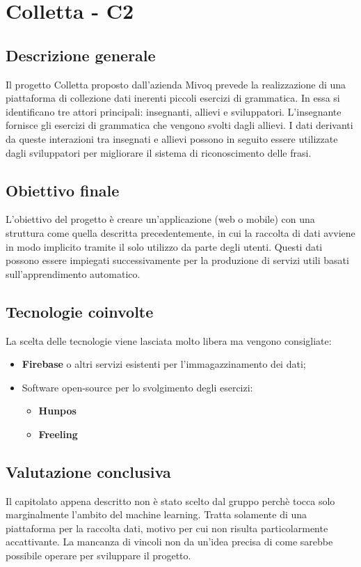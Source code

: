 \section{Colletta - C2} \label{c2}
    \subsection{Descrizione generale}
    Il progetto Colletta proposto dall'azienda Mivoq prevede la realizzazione di una piattaforma di collezione dati inerenti piccoli esercizi di grammatica. In essa si identificano tre attori principali: insegnanti, allievi e sviluppatori. L'insegnante fornisce gli esercizi di grammatica che vengono svolti dagli allievi. I dati derivanti da queste interazioni tra insegnati e allievi possono in seguito essere utilizzate dagli sviluppatori per migliorare il sistema di riconoscimento delle frasi.

    \subsection{Obiettivo finale}
    L'obiettivo del progetto è creare un'applicazione (web o mobile) con una struttura come quella descritta precedentemente, in cui la raccolta di dati avviene in modo implicito tramite il solo utilizzo da parte degli utenti. Questi dati possono essere impiegati successivamente per la produzione di servizi utili basati sull'apprendimento automatico.

    \subsection{Tecnologie coinvolte}
    La scelta delle tecnologie viene lasciata molto libera ma vengono consigliate:
    	\begin{itemize}
    		\item \textbf{Firebase} o altri servizi esistenti per l'immagazzinamento dei dati;
    		\item Software open-source per lo svolgimento degli esercizi:
    		\begin{itemize}
    			\item \textbf{Hunpos} 
    			\item \textbf{Freeling}
    		\end{itemize}
    	\end{itemize}

    \subsection{Valutazione conclusiva}
    Il capitolato appena descritto non è stato scelto dal gruppo perchè tocca solo marginalmente l'ambito del machine learning. Tratta solamente di una piattaforma per la raccolta dati, motivo per cui non risulta particolarmente accattivante. La mancanza di vincoli non da un'idea precisa di come sarebbe possibile operare per sviluppare il progetto.
